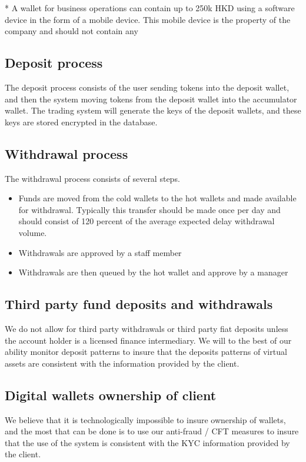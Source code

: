 * A wallet for business operations can contain up to 250k HKD using a
software device in the form of a mobile device.  This mobile device is
the property of the company and should not contain any

\subsection{Deposit process}
The deposit process consists of the user sending tokens into the
deposit wallet, and then the system moving tokens from the deposit
wallet into the accumulator wallet.  The trading system will generate
the keys of the deposit wallets, and these keys are stored encrypted
in the database.

\subsection{Withdrawal process}
The withdrawal process consists of several steps.
\begin{itemize}
  \item Funds are moved from the cold wallets to the hot wallets and
    made available for withdrawal.  Typically this transfer should be
    made once per day and should consist of 120 percent of the average
    expected delay withdrawal volume.
  \item Withdrawals are approved by a staff member
  \item Withdrawals are then queued by the hot wallet and approve by a manager
\end{itemize}

\subsection{Third party fund deposits and withdrawals}
We do not allow for third party withdrawals or third party fiat
deposits unless the account holder is a licensed finance intermediary.
We will to the best of our ability monitor deposit patterns to insure
that the deposits patterns of virtual assets are consistent with the
information provided by the client.

\subsection{Digital wallets ownership of client}
We believe that it is technologically impossible to insure ownership
of wallets, and the most that can be done is to use our anti-fraud /
CFT measures to insure that the use of the system is consistent with
the KYC information provided by the client.

